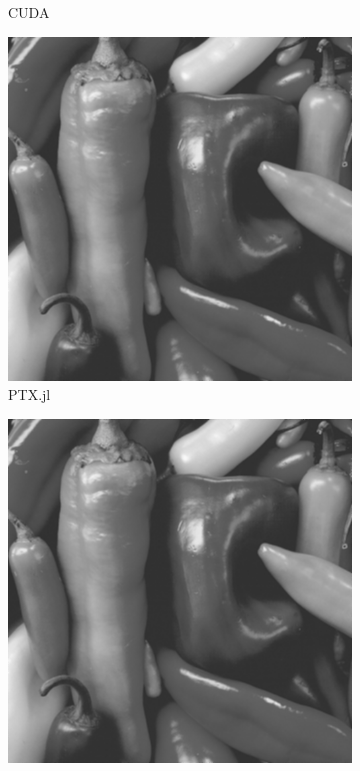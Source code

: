 \begin{markdown}
\begin{figure}[H]
\begin{subfigure}{.49\textwidth}
    \caption{CUDA}
    \label{fig:res:blur:pic:cuda}
  \end{subfigure}%
  \hspace{.01\textwidth}
  \begin{subfigure}{.49\textwidth}
    \centering
    \includegraphics[width=1\textwidth]{body/figures/results/blur/julia.png}
    \caption{PTX.jl}
    \label{fig:res:blur:pic:julia}
  \end{subfigure}%
  \hspace{.01\textwidth}
  \begin{subfigure}{.49\textwidth}
    \centering
    \includegraphics[width=1\textwidth]{body/figures/results/blur/opencl.png}

\end{subfigure}
\end{figure}
\end{markdown}
